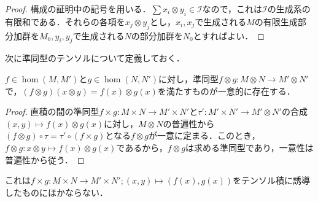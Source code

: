 \begin{proof}
	構成の証明中の記号を用いる．$\sum x_i\otimes y_i\in\mathcal{I}$なので，これは$\mathcal{I}$の生成系の有限和である．それらの各項を$x_j\otimes y_j$とし，$x_i,x_j$で生成される$M$の有限生成部分加群を$M_0,y_i,y_j$で生成される$N$の部分加群を$N_0$とすればよい．
\end{proof}

次に準同型のテンソルについて定義しておく．

\begin{prop}
	$f\in\hom(M,M')$と$g\in\hom(N,N')$に対し，準同型$f\otimes g:M\otimes N\to M'\otimes N'$で，$(f\otimes g)(x\otimes y)=f(x)\otimes g(x)$を満たすものが一意的に存在する．
\end{prop}
\begin{proof}
	直積の間の準同型$f\times g:M\times N\to M'\times N'$と$\tau':M'\times N'\to M'\otimes N'$の合成$(x,y)\mapsto f(x)\otimes g(x)$に対し，$M\otimes N$の普遍性から$(f\otimes g)\circ\tau=\tau'\circ(f\times g)$となる$f\otimes g$が一意に定まる．このとき，$f\otimes g:x\otimes y\mapsto f(x)\otimes g(x)$であるから，$f\otimes g$は求める準同型であり，一意性は普遍性から従う．
\end{proof}
これは$f\times g:M\times N\to M'\times N';(x,y)\mapsto (f(x),g(x))$をテンソル積に誘導したものにほかならない．

